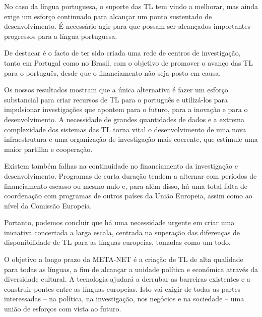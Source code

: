 \begin{multicols}{2}
No caso da língua portuguesa, o suporte das TL tem vindo a melhorar, mas ainda exige um esforço continuado para alcançar um ponto sustentado de desenvolvimento. É necessário agir para que possam ser alcançados importantes progressos para a língua portuguesa.

De destacar é o facto de ter sido criada uma rede de centros de investigação, tanto em Portugal como no Brasil, com o objetivo de promover o avanço das TL para o português, desde que o financiamento não seja posto em causa.

Os nossos resultados mostram que a única alternativa é fazer um esforço substancial para criar recursos de TL para o português e utilizá-los para impulsionar investigações que apontem para o futuro, para a inovação e para o desenvolvimento. A necessidade de grandes quantidades de dados e a extrema complexidade dos sistemas das TL torna vital o desenvolvimento de uma nova infraestrutura e uma organização de investigação mais coerente, que estimule uma maior partilha e cooperação.

Existem também falhas na continuidade no financiamento da investigação e desenvolvimento. Programas de curta duração tendem a alternar com períodos de financiamento escasso ou mesmo nulo e, para além disso, há uma total falta de coordenação com programas de outros países da União Europeia, assim como ao nível da Comissão Europeia.

Portanto, podemos concluir que há uma necessidade urgente em criar uma iniciativa concertada a larga escala, centrada na superação das diferenças de disponibilidade de TL para as línguas europeias, tomadas como um todo.

O objetivo a longo prazo da META-NET é a criação de TL de alta qualidade para todas as línguas, a fim de alcançar a unidade política e económica através da diversidade cultural. A tecnologia ajudará a derrubar as barreiras existentes e a construir pontes entre as línguas europeias. Isto vai exigir de todas as partes interessadas – na política, na investigação, nos negócios e na sociedade – uma união de esforços com vista ao futuro.
\end{multicols}

\cleardoublepage



